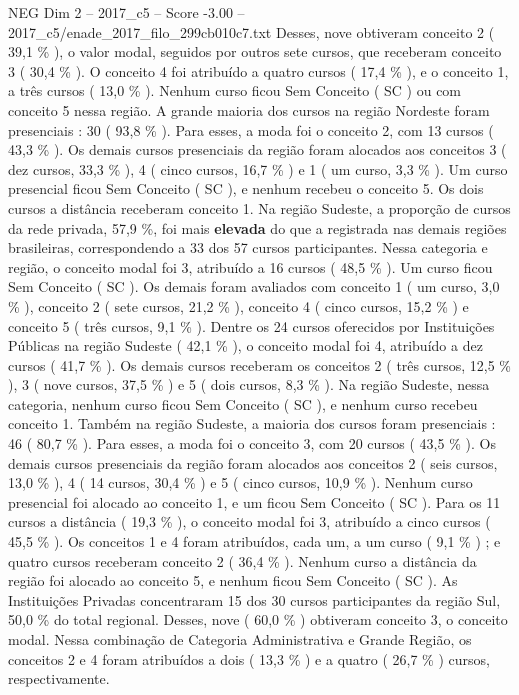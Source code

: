 \begin{textsample}{NEG Dim 2 – 2017\_c5 – Score -3.00 – 2017\_c5/enade\_2017\_filo\_299cb010c7.txt}
Desses, nove obtiveram conceito 2 ( 39,1 \% ), o valor modal, seguidos por outros sete cursos, que receberam conceito 3 ( 30,4 \% ).
O conceito 4 foi atribuído a quatro cursos ( 17,4 \% ), e o conceito 1, a três cursos ( 13,0 \% ).
Nenhum curso ficou Sem Conceito ( SC ) ou com conceito 5 nessa região.
A grande maioria dos cursos na região Nordeste foram presenciais : 30 ( 93,8 \% ).
Para esses, a moda foi o conceito 2, com 13 cursos ( 43,3 \% ).
Os demais cursos presenciais da região foram alocados aos conceitos 3 ( dez cursos, 33,3 \% ), 4 ( cinco cursos, 16,7 \% ) e 1 ( um curso, 3,3 \% ).
Um curso presencial ficou Sem Conceito ( SC ), e nenhum recebeu o conceito 5.
Os dois cursos a distância receberam conceito 1.
Na região Sudeste, a proporção de cursos da rede privada, 57,9 \%, foi mais \textbf{elevada} do que a registrada nas demais regiões brasileiras, correspondendo a 33 dos 57 cursos participantes.
Nessa categoria e região, o conceito modal foi 3, atribuído a 16 cursos ( 48,5 \% ).
Um curso ficou Sem Conceito ( SC ).
Os demais foram avaliados com conceito 1 ( um curso, 3,0 \% ), conceito 2 ( sete cursos, 21,2 \% ), conceito 4 ( cinco cursos, 15,2 \% ) e conceito 5 ( três cursos, 9,1 \% ).
Dentre os 24 cursos oferecidos por Instituições Públicas na região Sudeste ( 42,1 \% ), o conceito modal foi 4, atribuído a dez cursos ( 41,7 \% ).
Os demais cursos receberam os conceitos 2 ( três cursos, 12,5 \% ), 3 ( nove cursos, 37,5 \% ) e 5 ( dois cursos, 8,3 \% ).
Na região Sudeste, nessa categoria, nenhum curso ficou Sem Conceito ( SC ), e nenhum curso recebeu conceito 1.
Também na região Sudeste, a maioria dos cursos foram presenciais : 46 ( 80,7 \% ).
Para esses, a moda foi o conceito 3, com 20 cursos ( 43,5 \% ).
Os demais cursos presenciais da região foram alocados aos conceitos 2 ( seis cursos, 13,0 \% ), 4 ( 14 cursos, 30,4 \% ) e 5 ( cinco cursos, 10,9 \% ).
Nenhum curso presencial foi alocado ao conceito 1, e um ficou Sem Conceito ( SC ).
Para os 11 cursos a distância ( 19,3 \% ), o conceito modal foi 3, atribuído a cinco cursos ( 45,5 \% ).
Os conceitos 1 e 4 foram atribuídos, cada um, a um curso ( 9,1 \% ) ; e quatro cursos receberam conceito 2 ( 36,4 \% ).
Nenhum curso a distância da região foi alocado ao conceito 5, e nenhum ficou Sem Conceito ( SC ).
As Instituições Privadas concentraram 15 dos 30 cursos participantes da região Sul, 50,0 \% do total regional.
Desses, nove ( 60,0 \% ) obtiveram conceito 3, o conceito modal.
Nessa combinação de Categoria Administrativa e Grande Região, os conceitos 2 e 4 foram atribuídos a dois ( 13,3 \% ) e a quatro ( 26,7 \% ) cursos, respectivamente.

\end{textsample}
